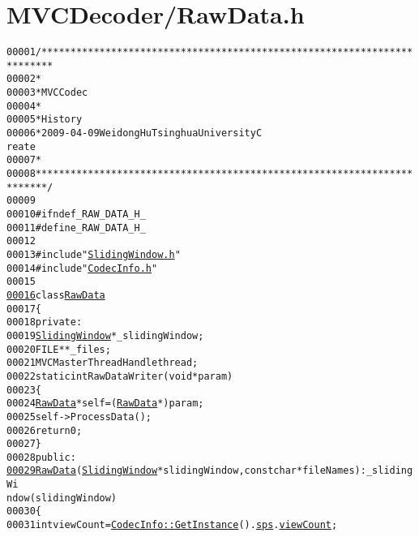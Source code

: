 \hypertarget{_raw_data_8h_source}{
\section{MVCDecoder/RawData.h}
}


\begin{footnotesize}\begin{alltt}
00001 \textcolor{comment}{/************************************************************************}
00002 \textcolor{comment}{ *}
00003 \textcolor{comment}{ * MVC Codec}
00004 \textcolor{comment}{ * }
00005 \textcolor{comment}{ * History}
00006 \textcolor{comment}{ * 2009-04-09           Weidong Hu              Tsinghua University             C
      reate}
00007 \textcolor{comment}{ * }
00008 \textcolor{comment}{ ************************************************************************/}
00009 
00010 \textcolor{preprocessor}{#ifndef \_RAW\_DATA\_H\_}
00011 \textcolor{preprocessor}{}\textcolor{preprocessor}{#define \_RAW\_DATA\_H\_}
00012 \textcolor{preprocessor}{}
00013 \textcolor{preprocessor}{#include "\hyperlink{_sliding_window_8h}{SlidingWindow.h}"}
00014 \textcolor{preprocessor}{#include "\hyperlink{_codec_info_8h}{CodecInfo.h}"}
00015 
\hypertarget{_raw_data_8h_source_l00016}{}\hyperlink{class_raw_data}{00016} \textcolor{keyword}{class }\hyperlink{class_raw_data}{RawData}
00017 \{
00018 \textcolor{keyword}{private}:
00019         \hyperlink{class_sliding_window}{SlidingWindow} *\_slidingWindow;
00020         FILE **\_files;
00021         MVCMasterThreadHandle thread;
00022         \textcolor{keyword}{static} \textcolor{keywordtype}{int} RawDataWriter(\textcolor{keywordtype}{void} *param)
00023         \{
00024                 \hyperlink{class_raw_data}{RawData} *\textcolor{keyword}{self} = (\hyperlink{class_raw_data}{RawData} *)param;
00025                 \textcolor{keyword}{self}->ProcessData();
00026                 \textcolor{keywordflow}{return} 0;
00027         \}
00028 \textcolor{keyword}{public}:
\hypertarget{_raw_data_8h_source_l00029}{}\hyperlink{class_raw_data_a9a8f2f3170c5574096ea14611f38aca8}{00029}         \hyperlink{class_raw_data_a9a8f2f3170c5574096ea14611f38aca8}{RawData}(\hyperlink{class_sliding_window}{SlidingWindow} *slidingWindow, \textcolor{keyword}{const} \textcolor{keywordtype}{char} *fileNames) : \_slidingWi
      ndow(slidingWindow)
00030         \{
00031                 \textcolor{keywordtype}{int} viewCount = \hyperlink{class_codec_info_ad439fd8062a03d868dfe9c9b615b747e}{CodecInfo::GetInstance}().\hyperlink{class_codec_info_aee785011cec77ff3c0c646b498fe1e7d}{sps}.\hyperlink{struct_sequence_parameters_set_af32c7819f630856ccd99aaf78e8f656c}{viewCount};

\end{alltt}
\end{footnotesize}
